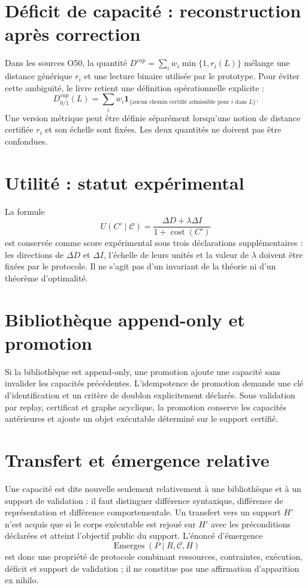 \documentclass[11pt,a4paper,openany]{book}
\begin{document}
\section{Déficit de capacité : reconstruction après correction}
Dans les sources O50, la quantité $D^{cap}=\sum_i w_i\min\{1,r_i(L)\}$ mélange une distance générique $r_i$ et une lecture binaire utilisée par le prototype. Pour éviter cette ambiguïté, le livre retient une définition opérationnelle explicite :
\[
D^{cap}_{0/1}(L)=\sum_i w_i\mathbf 1_{\{\text{aucun chemin certifié admissible pour }i\text{ dans }L\}}.
\]
Une version métrique peut être définie séparément lorsqu'une notion de distance certifiée $r_i$ et son échelle sont fixées. Les deux quantités ne doivent pas être confondues.

\section{Utilité : statut expérimental}
La formule
\[
U(C'\mid\mathcal C)=\frac{\Delta D+\lambda\Delta I}{1+\operatorname{cost}(C')}
\]
est conservée comme score expérimental sous trois déclarations supplémentaires : les directions de $\Delta D$ et $\Delta I$, l'échelle de leurs unités et la valeur de $\lambda$ doivent être fixées par le protocole. Il ne s'agit pas d'un invariant de la théorie ni d'un théorème d'optimalité.

\section{Bibliothèque append-only et promotion}
Si la bibliothèque est append-only, une promotion ajoute une capacité sans invalider les capacités précédentes. L'idempotence de promotion demande une clé d'identification et un critère de doublon explicitement déclarés. Sous validation par replay, certificat et graphe acyclique, la promotion conserve les capacités antérieures et ajoute un objet exécutable déterminé sur le support certifié.

\section{Transfert et émergence relative}
Une capacité est dite nouvelle seulement relativement à une bibliothèque et à un support de validation : il faut distinguer différence syntaxique, différence de représentation et différence comportementale. Un transfert vers un support $H'$ n'est acquis que si le corps exécutable est rejoué sur $H'$ avec les préconditions déclarées et atteint l'objectif public du support. L'énoncé d'émergence
\[
\operatorname{Emerges}(P\mid R,\mathcal C,H)
\]
est donc une propriété de protocole combinant ressources, contraintes, exécution, déficit et support de validation ; il ne constitue pas une affirmation d'apparition ex nihilo.
\end{document}
